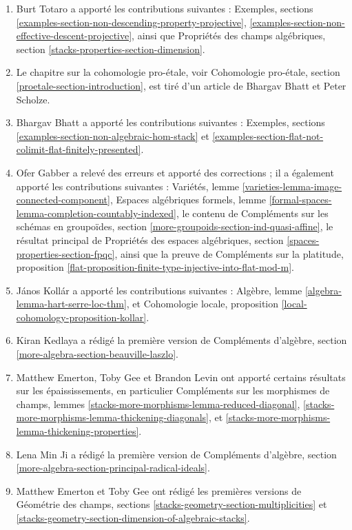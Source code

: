 \begin{enumerate}
Compl\'ements sur les groupo\"ides dans les espaces, sections
\ref{spaces-more-groupoids-section-finite} et
\ref{spaces-more-groupoids-section-etale-localize}.
\item Burt Totaro a apport\'e les contributions suivantes : Exemples, sections
\ref{examples-section-non-descending-property-projective},
\ref{examples-section-non-effective-descent-projective},
ainsi que
Propri\'et\'es des champs algébriques, section \ref{stacks-properties-section-dimension}.
\item Le chapitre sur la cohomologie pro-\'etale, voir
Cohomologie pro-\'etale, section \ref{proetale-section-introduction},
est tir\'e d'un article de Bhargav Bhatt et Peter Scholze.
\item Bhargav Bhatt a apport\'e les contributions suivantes : Exemples, sections
\ref{examples-section-non-algebraic-hom-stack} et
\ref{examples-section-flat-not-colimit-flat-finitely-presented}.
\item Ofer Gabber a relev\'e des erreurs et apport\'e des corrections ; il a
\'egalement apport\'e les contributions suivantes :
Vari\'et\'es, lemme \ref{varieties-lemma-image-connected-component},
Espaces algébriques formels, lemme \ref{formal-spaces-lemma-completion-countably-indexed},
le contenu de
Compl\'ements sur les schémas en groupoïdes, section \ref{more-groupoids-section-ind-quasi-affine},
le r\'esultat principal de
Propri\'et\'es des espaces algébriques, section \ref{spaces-properties-section-fpqc},
ainsi que la preuve de
Compl\'ements sur la platitude, proposition
\ref{flat-proposition-finite-type-injective-into-flat-mod-m}.
\item J\'anos Koll\'ar a apport\'e les contributions suivantes :
Alg\`ebre, lemme \ref{algebra-lemma-hart-serre-loc-thm}, et
Cohomologie locale, proposition \ref{local-cohomology-proposition-kollar}.
\item Kiran Kedlaya a r\'edig\'e la premi\`ere version de
Compl\'ements d'alg\`ebre, section \ref{more-algebra-section-beauville-laszlo}.
\item Matthew Emerton, Toby Gee et Brandon Levin ont apport\'e
certains r\'esultats sur les \'epaississements, en particulier
Compl\'ements sur les morphismes de champs, lemmes
\ref{stacks-more-morphisms-lemma-reduced-diagonal},
\ref{stacks-more-morphisms-lemma-thickening-diagonals}, et
\ref{stacks-more-morphisms-lemma-thickening-properties}.
\item Lena Min Ji a r\'edig\'e la premi\`ere version de
Compl\'ements d'alg\`ebre, section \ref{more-algebra-section-principal-radical-ideals}.
\item Matthew Emerton et Toby Gee ont r\'edig\'e les premi\`eres versions de
G\'eom\'etrie des champs,
sections \ref{stacks-geometry-section-multiplicities} et
\ref{stacks-geometry-section-dimension-of-algebraic-stacks}.
\end{enumerate}









